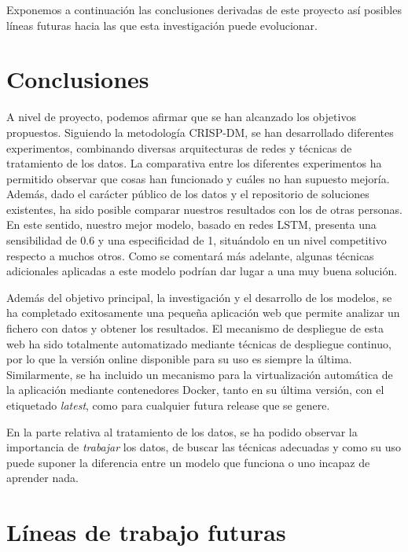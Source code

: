 
Exponemos a continuación las conclusiones derivadas de este proyecto así posibles líneas futuras hacia las que esta investigación puede evolucionar.

\section{Conclusiones}

A nivel de proyecto, podemos afirmar que se han alcanzado los objetivos propuestos. Siguiendo la metodología CRISP-DM, se han desarrollado diferentes experimentos, combinando diversas arquitecturas de redes y técnicas de tratamiento de los datos. La comparativa entre los diferentes experimentos ha permitido observar que cosas han funcionado y cuáles no han supuesto mejoría. Además, dado el carácter público de los datos y el repositorio de soluciones existentes, ha sido posible comparar nuestros resultados con los de otras personas. En este sentido, nuestro mejor modelo, basado en redes LSTM, presenta una sensibilidad de 0.6 y una especificidad de 1, situándolo en un nivel competitivo respecto a muchos otros. Como se comentará más adelante, algunas técnicas adicionales aplicadas a este modelo podrían dar lugar a una muy buena solución.

Además del objetivo principal, la investigación y el desarrollo de los modelos, se ha completado exitosamente una pequeña aplicación web que permite analizar un fichero con datos y obtener los resultados. El mecanismo de despliegue de esta web ha sido totalmente automatizado mediante técnicas de despliegue continuo, por lo que la versión online disponible para su uso es siempre la última. Similarmente, se ha incluido un mecanismo para la virtualización automática de la aplicación mediante contenedores Docker, tanto en su última versión, con el etiquetado \textit{latest}, como para cualquier futura release que se genere. 

En la parte relativa al tratamiento de los datos, se ha podido observar la importancia de \textit{trabajar} los datos, de buscar las técnicas adecuadas y como su uso puede suponer la diferencia entre un modelo que funciona o uno incapaz de aprender nada.

\section{Líneas de trabajo futuras}

